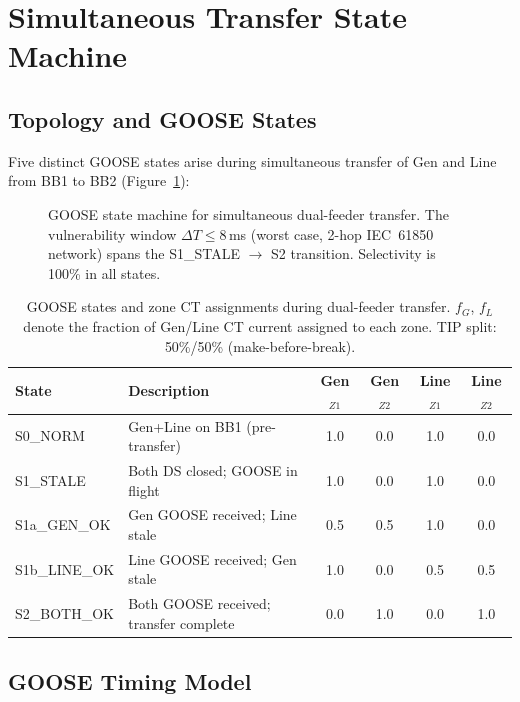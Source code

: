 \documentclass[11pt, a4paper]{article}
\begin{document}
\section{Simultaneous Transfer State Machine}
\label{sec:states}

\subsection{Topology and GOOSE States}

Five distinct GOOSE states arise during simultaneous transfer of Gen and Line
from BB1 to BB2 (Figure~\ref{fig:sm}):

\begin{figure}[h]
  \centering
  
  \caption{GOOSE state machine for simultaneous dual-feeder transfer.
           The vulnerability window $\Delta T \leq 8$\,ms (worst case,
           2-hop IEC~61850 network) spans the S1\_STALE $\to$ S2 transition.
           Selectivity is 100\% in all states.}
  \label{fig:sm}
\end{figure}

\begin{table}[h]
  \centering
  \caption{GOOSE states and zone CT assignments during dual-feeder transfer.
           $f_G$, $f_L$ denote the fraction of Gen/Line CT current assigned
           to each zone.  TIP split: 50\%/50\% (make-before-break).}
  \label{tab:states}
  \begin{tabular}{llcccc}
    \toprule
    State & Description & Gen$_{Z1}$ & Gen$_{Z2}$ & Line$_{Z1}$ & Line$_{Z2}$ \\
    \midrule
    S0\_NORM    & Gen+Line on BB1 (pre-transfer) & 1.0 & 0.0 & 1.0 & 0.0 \\
    S1\_STALE   & Both DS closed; GOOSE in flight & 1.0 & 0.0 & 1.0 & 0.0 \\
    S1a\_GEN\_OK & Gen GOOSE received; Line stale  & 0.5 & 0.5 & 1.0 & 0.0 \\
    S1b\_LINE\_OK& Line GOOSE received; Gen stale  & 1.0 & 0.0 & 0.5 & 0.5 \\
    S2\_BOTH\_OK & Both GOOSE received; transfer complete & 0.0 & 1.0 & 0.0 & 1.0 \\
    \bottomrule
  \end{tabular}
\end{table}

\subsection{GOOSE Timing Model}
\end{document}
